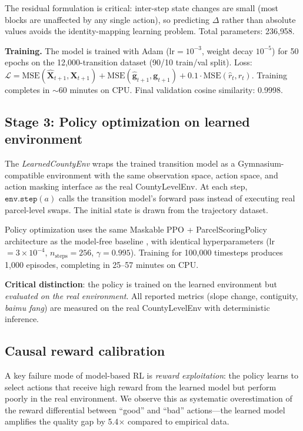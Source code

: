 \documentclass[11pt]{article}
\begin{document}
The residual formulation is critical: inter-step state changes are small (most blocks are unaffected by any single action), so predicting $\Delta$ rather than absolute values avoids the identity-mapping learning problem. Total parameters: 236{,}958.

\textbf{Training.} The model is trained with Adam ($\text{lr} = 10^{-3}$, weight decay $10^{-5}$) for 50 epochs on the 12{,}000-transition dataset (90/10 train/val split). Loss: $\mathcal{L} = \text{MSE}(\hat{\mathbf{X}}_{t+1}, \mathbf{X}_{t+1}) + \text{MSE}(\hat{\mathbf{g}}_{t+1}, \mathbf{g}_{t+1}) + 0.1 \cdot \text{MSE}(\hat{r}_t, r_t)$. Training completes in $\sim$60 minutes on CPU. Final validation cosine similarity: 0.9998.

\subsection{Stage 3: Policy optimization on learned environment}

The \textit{LearnedCountyEnv} wraps the trained transition model as a Gymnasium-compatible environment with the same observation space, action space, and action masking interface as the real CountyLevelEnv. At each step, $\texttt{env.step}(a)$ calls the transition model's forward pass instead of executing real parcel-level swaps. The initial state is drawn from the trajectory dataset.

Policy optimization uses the same Maskable PPO + ParcelScoringPolicy architecture as the model-free baseline \citep{zhou2026county}, with identical hyperparameters (lr $= 3 \times 10^{-4}$, $n_\text{steps} = 256$, $\gamma = 0.995$). Training for 100{,}000 timesteps produces 1{,}000 episodes, completing in 25--57 minutes on CPU.

\textbf{Critical distinction}: the policy is trained on the learned environment but \textit{evaluated on the real environment}. All reported metrics (slope change, contiguity, \textit{baimu fang}) are measured on the real CountyLevelEnv with deterministic inference.

\subsection{Causal reward calibration}
\label{sec:calibration}

A key failure mode of model-based RL is \textit{reward exploitation}: the policy learns to select actions that receive high reward from the learned model but perform poorly in the real environment. We observe this as systematic overestimation of the reward differential between ``good'' and ``bad'' actions---the learned model amplifies the quality gap by 5.4$\times$ compared to empirical data.
\end{document}
